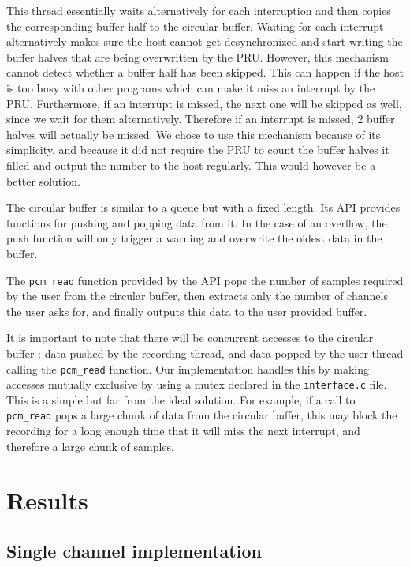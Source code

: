 \documentclass[]{report}
\begin{document}
This thread essentially waits alternatively for each interruption and then copies the corresponding buffer half to the circular buffer. Waiting for each interrupt alternatively makes sure the host cannot get desynchronized and start writing the buffer halves that are being overwritten by the PRU. However, this mechanism cannot detect whether a buffer half has been skipped. This can happen if the host is too busy with other programs which can make it miss an interrupt by the PRU. Furthermore, if an interrupt is missed, the next one will be skipped as well, since we wait for them alternatively. Therefore if an interrupt is missed, 2 buffer halves will actually be missed. We chose to use this mechanism because of its simplicity, and because it did not require the PRU to count the buffer halves it filled and output the number to the host regularly. This would however be a better solution.

The circular buffer is similar to a queue but with a fixed length. Its API provides functions for pushing and popping data from it. In the case of an overflow, the push function will only trigger a warning and overwrite the oldest data in the buffer.

The \texttt{pcm\_read} function provided by the API pops the number of samples required by the user from the circular buffer, then extracts only the number of channels the user asks for, and finally outputs this data to the user provided buffer.

It is important to note that there will be concurrent accesses to the circular buffer : data pushed by the recording thread, and data popped by the user thread calling the \texttt{pcm\_read} function. Our implementation handles this by making accesses mutually exclusive by using a mutex declared in the \texttt{interface.c} file. This is a simple but far from the ideal solution. For example, if a call to \texttt{pcm\_read} pops a large chunk of data from the circular buffer, this may block the recording for a long enough time that it will miss the next interrupt, and therefore a large chunk of samples.

\hypertarget{results}{%
\chapter{Results}\label{results}}

\hypertarget{single-channel-implementation}{%
\section{Single channel
implementation}\label{single-channel-implementation}}
\end{document}
